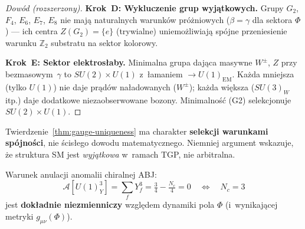 \begin{proof}[Dowód (rozszerzony)]
\textbf{Krok~D: Wykluczenie grup wyjątkowych.}
Grupy $G_2$, $F_4$, $E_6$, $E_7$, $E_8$ nie mają naturalnych
warunków próżniowych ($\beta = \gamma$ dla sektora $\Phi$) ---
ich centra $Z(G_2) = \{e\}$ (trywialne) uniemo\.zliwiaj\k{a}
sp\'ojne przeniesienie warunku $\mathbb{Z}_2$ substratu na sektor kolorowy.

\textbf{Krok~E: Sektor elektrosłaby.}
Minimalna grupa dająca masywne $W^\pm$, $Z$ przy bezmasowym~$\gamma$
to $SU(2) \times U(1)$ z~łamaniem $\to U(1)_{\mathrm{EM}}$.
Każda mniejsza (tylko $U(1)$) nie daje prądów naładowanych ($W^\pm$);
każda większa ($SU(3)_W$ itp.) daje dodatkowe niezaobserwowane bozony.
Minimalność (G2) selekcjonuje $SU(2) \times U(1)$.
\end{proof}

\begin{remark}%
\label{rem:gauge-uniqueness-status}
Twierdzenie~\ref{thm:gauge-uniqueness} ma charakter
\textbf{selekcji warunkami spójności}, nie ścisłego dowodu
matematycznego. Niemniej argument wskazuje,
że struktura SM jest \emph{wyjątkowa} w~ramach TGP,
nie arbitralna.
\end{remark}

\begin{theorem}%
\label{thm:anomaly-Phi-robust}

Warunek anulacji anomalii chiralnej ABJ:
\begin{equation}\label{eq:anomaly-ABJ-Phi}
  \mathcal{A}[U(1)_Y^3]
  = \sum_f Y_f^3
  = \tfrac{3}{4} - \tfrac{N_c}{4}
  = 0
  \quad\Longleftrightarrow\quad N_c = 3
\end{equation}
jest \textbf{dok\l{}adnie niezmienniczy} wzgl\k{e}dem dynamiki
pola $\Phi$ (i~wynikaj\k{a}cej metryki $g_{\mu\nu}(\Phi)$).
\end{theorem}

